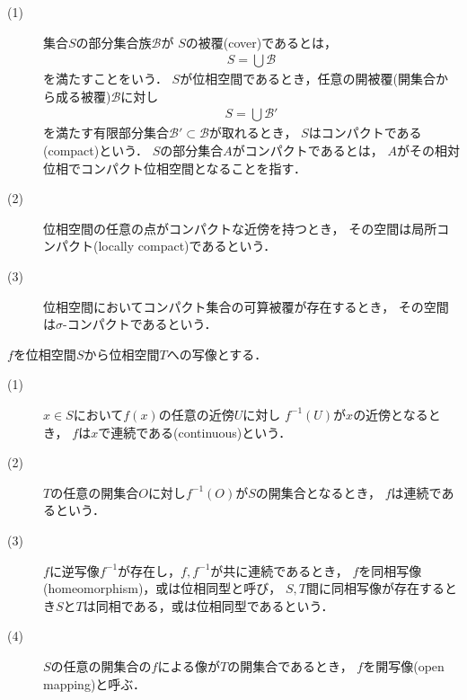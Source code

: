 	\begin{screen}
		\begin{dfn}\mbox{}
			\begin{description}
				\item[(1)]
					集合$S$の部分集合族$\mathscr{B}$が
					$S$の被覆(cover)であるとは，
					\begin{align}
						S = \bigcup \mathscr{B}
					\end{align}
					を満たすことをいう．
					$S$が位相空間であるとき，任意の開被覆(開集合から成る被覆)$\mathscr{B}$に対し
					\begin{align}
						S = \bigcup \mathscr{B}'
					\end{align}
					を満たす有限部分集合$\mathscr{B}' \subset \mathscr{B}$が取れるとき，
					$S$はコンパクトである(compact)という．
					$S$の部分集合$A$がコンパクトであるとは，
					$A$がその相対位相でコンパクト位相空間となることを指す．
				
				\item[(2)] 位相空間の任意の点がコンパクトな近傍を持つとき，
					その空間は局所コンパクト(locally compact)であるという．
					
				\item[(3)] 位相空間においてコンパクト集合の可算被覆が存在するとき，
					その空間は$\sigma$-コンパクトであるという．
			\end{description}
		\end{dfn}
	\end{screen}
	
	\begin{screen}
		\begin{thm}[コンパクト部分集合]
		\end{thm}
	\end{screen}
	
	\begin{screen}
		\begin{dfn}[連続・同相・開写像]
			$f$を位相空間$S$から位相空間$T$への写像とする．
			\begin{description}
				\item[(1)]
					$x \in S$において$f(x)$の任意の近傍$U$に対し
					$f^{-1}(U)$が$x$の近傍となるとき，
					$f$は$x$で連続である(continuous)という．
					
				\item[(2)] $T$の任意の開集合$O$に対し$f^{-1}(O)$が$S$の開集合となるとき，
					$f$は連続であるという．
					
				\item[(3)] $f$に逆写像$f^{-1}$が存在し，$f,f^{-1}$が共に連続であるとき，
					$f$を同相写像(homeomorphism)，或は位相同型と呼び，
					$S,T$間に同相写像が存在するとき$S$と$T$は同相である，或は位相同型であるという．
					
				\item[(4)] $S$の任意の開集合の$f$による像が$T$の開集合であるとき，
					$f$を開写像(open mapping)と呼ぶ．
			\end{description}
		\end{dfn}
	\end{screen}
	
